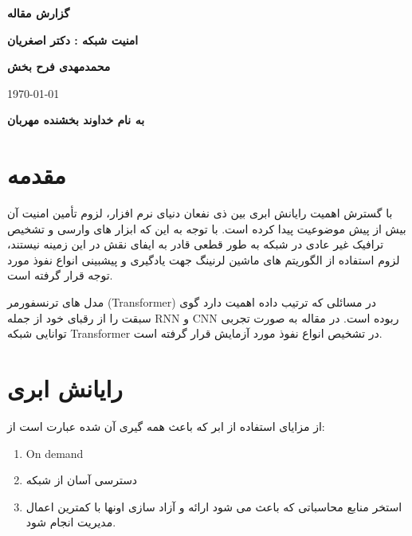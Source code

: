 \documentclass{report}
\begin{document}
		\begin{titlepage}
			
			\centering
			\vspace*{2cm}
			\textbf{\LARGE گزارش مقاله}
			
			\textbf{\LARGE {}}
			\vspace{1cm}
			
			
			
			\vfill
			
			\textbf{امنیت شبکه : دکتر اصغریان}
			
			\textbf{محمدمهدی فرح بخش}
			
			\vspace{1cm}
			\today
		\end{titlepage}
		\begin{center}
			\textbf{به نام خداوند بخشنده مهربان}
		\end{center}
		
		\section{مقدمه}
		با گسترش اهمیت رایانش ابری بین ذی نفعان دنیای نرم افزار، لزوم تأمین  امنیت آن  بیش از پیش موضوعیت پیدا کرده است. با توجه به این که ابزار های وارسی و تشخیص ترافیک غیر عادی در شبکه به طور قطعی قادر به ایفای نقش در این زمینه نیستند، لزوم استفاده از الگوریتم های ماشین لرنینگ جهت یادگیری و پیشبینی انواع نفوذ مورد توجه قرار گرفته است. 
		
		مدل های ترنسفورمر (Transformer) در مسائلی که ترتیب داده اهمیت دارد گوی سبقت را از رقبای خود از جمله
		 RNN
		 و
		 CNN
		  ربوده است. در مقاله
		   \cite{Transformer_based_network_intrusion_detection}
		  	به صورت تجربی توانایی شبکه Transformer در تشخیص انواع نفوذ مورد آزمایش قرار گرفته است.

		\section{رایانش ابری}
		از مزایای استفاده از ابر که باعث همه گیری آن شده عبارت است از:
			\begin{enumerate}
				\item 
				On demand
				\item 
				دسترسی آسان از شبکه
				\item 
				استخر منابع محاسباتی که باعث می شود ارائه و آزاد سازی اونها با کمترین اعمال مدیریت انجام شود.
			\end{enumerate}
		
\end{document}

